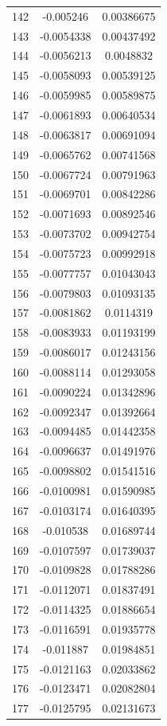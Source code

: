 \documentclass[a4paper, 11pt, oneside]{report}
\begin{document}
{\begin{longtable}{|c|c|c|}
142 & -0.005246  & 0.00386675 \\
143 & -0.0054338 & 0.00437492 \\
144 & -0.0056213 & 0.0048832  \\
145 & -0.0058093 & 0.00539125 \\
146 & -0.0059985 & 0.00589875 \\
147 & -0.0061893 & 0.00640534 \\
148 & -0.0063817 & 0.00691094 \\
149 & -0.0065762 & 0.00741568 \\
150 & -0.0067724 & 0.00791963 \\
151 & -0.0069701 & 0.00842286 \\
152 & -0.0071693 & 0.00892546 \\
153 & -0.0073702 & 0.00942754 \\
154 & -0.0075723 & 0.00992918 \\
155 & -0.0077757 & 0.01043043 \\
156 & -0.0079803 & 0.01093135 \\
157 & -0.0081862 & 0.0114319  \\
158 & -0.0083933 & 0.01193199 \\
159 & -0.0086017 & 0.01243156 \\
160 & -0.0088114 & 0.01293058 \\
161 & -0.0090224 & 0.01342896 \\
162 & -0.0092347 & 0.01392664 \\
163 & -0.0094485 & 0.01442358 \\
164 & -0.0096637 & 0.01491976 \\
165 & -0.0098802 & 0.01541516 \\
166 & -0.0100981 & 0.01590985 \\
167 & -0.0103174 & 0.01640395 \\
168 & -0.010538  & 0.01689744 \\
169 & -0.0107597 & 0.01739037 \\
170 & -0.0109828 & 0.01788286 \\
171 & -0.0112071 & 0.01837491 \\
172 & -0.0114325 & 0.01886654 \\
173 & -0.0116591 & 0.01935778 \\
174 & -0.011887  & 0.01984851 \\
175 & -0.0121163 & 0.02033862 \\
176 & -0.0123471 & 0.02082804 \\
177 & -0.0125795 & 0.02131673 \\

\end{longtable}}
\end{document}
